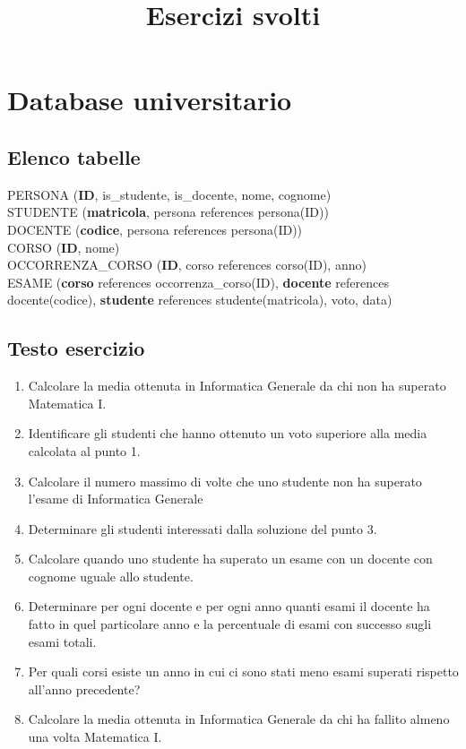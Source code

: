 \documentclass[11pt]{article}
\title{Esercizi svolti}
\begin{document}
\section{Database universitario}

\subsection{Elenco tabelle}

\noindent
PERSONA (\textbf{ID}, is\_studente, is\_docente, nome, cognome)\\
STUDENTE (\textbf{matricola}, persona references persona(ID))\\
DOCENTE (\textbf{codice}, persona references persona(ID))\\
CORSO (\textbf{ID}, nome)\\
OCCORRENZA\_CORSO (\textbf{ID}, corso references corso(ID), anno)\\
ESAME (\textbf{corso} references occorrenza\_corso(ID), \textbf{docente} references
docente(codice), \textbf{studente} references studente(matricola), voto, data)

\subsection{Testo esercizio}

\begin{enumerate}
\item
Calcolare la media ottenuta in Informatica Generale da chi non ha superato Matematica I.
\item
Identificare gli studenti che hanno ottenuto un voto superiore alla media calcolata al
punto 1.
\item
Calcolare il numero massimo di volte che uno studente non ha superato l'esame di
Informatica Generale
\item
Determinare gli studenti interessati dalla soluzione del punto 3.
\item
Calcolare quando uno studente ha superato un esame con un docente con cognome uguale allo
studente.
\item
Determinare per ogni docente e per ogni anno quanti esami il docente ha fatto
in
quel particolare anno e  la percentuale di esami con successo sugli esami
totali.
\item
Per quali corsi esiste un anno in cui ci sono stati meno esami superati
rispetto
all'anno precedente?
\item
Calcolare la media ottenuta in Informatica Generale da chi ha fallito almeno
una volta Matematica I.
\end{enumerate}
\end{document}
